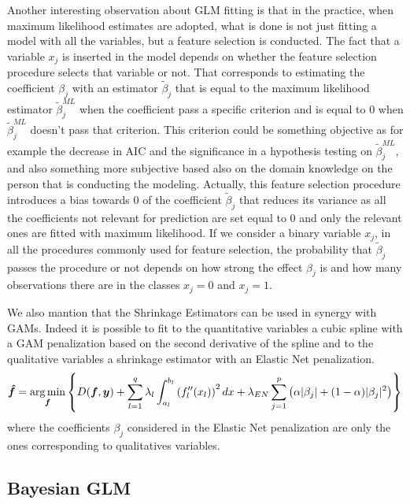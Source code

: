 \documentclass[a4paper, nobind]{templates/ociamthesis}
\theoremstyle{definition}
\theoremstyle{definition}
\theoremstyle{definition}
\theoremstyle{remark}
\begin{document}
Another interesting observation about GLM fitting is that in the practice, when maximum likelihood estimates are adopted, what is done is not just fitting a model with all the variables, but a feature selection is conducted. The fact that a variable \(x_j\) is inserted in the model depends on whether the feature selection procedure selects that variable or not. That corresponds to estimating the coefficient \(\beta_j\) with an estimator \(\tilde{\beta}_j\) that is equal to the maximum likelihood estimator \(\tilde{\beta}_j^{ML}\) when the coefficient pass a specific criterion and is equal to \(0\) when \(\tilde{\beta}_j^{ML}\) doesn't pass that criterion. This criterion could be something objective as for example the decrease in AIC and the significance in a hypothesis testing on \(\tilde{\beta}_j^{ML}\), and also something more subjective based also on the domain knowledge on the person that is conducting the modeling. Actually, this feature selection procedure introduces a bias towards \(0\) of the coefficient \(\tilde{\beta}_j\) that reduces its variance as all the coefficients not relevant for prediction are set equal to \(0\) and only the relevant ones are fitted with maximum likelihood. If we consider a binary variable \(x_j\), in all the procedures commonly used for feature selection, the probability that \(\tilde{\beta}_j\) passes the procedure or not depends on how strong the effect \(\beta_j\) is and how many observations there are in the classes \(x_j=0\) and \(x_j=1\).

We also mantion that the Shrinkage Estimators can be used in synergy with GAMs. Indeed it is possible to fit to the quantitative variables a cubic spline with a GAM penalization based on the second derivative of the spline and to the qualitative variables a shrinkage estimator with an Elastic Net penalization.
\begin{equation}
\label{eq:gam-en-est-deviance-multi}
\boldsymbol{\hat{f}} = \operatorname*{arg\,min}_{\boldsymbol{f}}
{\left\{
  D(\boldsymbol{f}, \boldsymbol{y})
    + \sum_{l=1}^{q}{
      \lambda_l \int_{a_l}^{b_l}{\left( f_l''(x_l) \right)^2 dx}
    }
    + \lambda_{EN} 
      \sum_{j=1}^p{\left(\alpha |\beta_j| + (1 - \alpha) |\beta_j|^2\right)}
\right\}
} 
\end{equation}
where the coefficients \(\beta_j\) considered in the Elastic Net penalization are only the ones corresponding to qualitatives variables.

\newpage

\hypertarget{chap:bayes-glm}{%
\subsection{Bayesian GLM}\label{chap:bayes-glm}}
\end{document}
